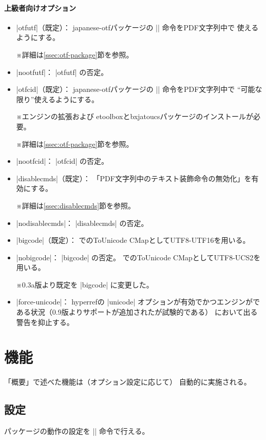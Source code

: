 \documentclass[uplatex,dvipdfmx,a4paper]{jsarticle}
\newcommand{\Pkg}[1]{\textsf{#1}}
\newcommand{\Note}{\par\noindent ※}
\newcommand{\Means}{：\quad}
\providecommand{\Strong}[1]{\textsf{#1}}
\begin{document}
\paragraph{上級者向けオプション}\mbox{}
\begin{itemize}
\item |otfutf|（既定）\Means
  \Pkg{japanese-otf}パッケージの |\UTF| 命令をPDF文字列中で
  使えるようにする。
  \Note 詳細は\ref{ssec:otf-package}節を参照。
\item |nootfutf|\Means
  |otfutf| の否定。
\item |otfcid|（既定）\Means
  \Pkg{japanese-otf}パッケージの |\CID| 命令をPDF文字列中で
  “可能な限り”使えるようにする。
  \Note エンジンの{\eTeX}拡張および
  \Pkg{etoolbox}と\Pkg{bxjatoucs}パッケージのインストールが必要。
  \Note 詳細は\ref{ssec:otf-package}節を参照。
\item |nootfcid|\Means
  |otfcid| の否定。
\item |disablecmds|（既定）\Means
  「PDF文字列中のテキスト装飾命令の無効化」を有効にする。
  \Note 詳細は\ref{ssec:disablecmds}節を参照。
\item |nodisablecmds|\Means
  |disablecmds| の否定。
\item |bigcode|（既定）\Means
  {\upTeX}でのToUnicode CMapとしてUTF8-UTF16を用いる。
\item |nobigcode|\Means
  |bigcode| の否定。
  {\upTeX}でのToUnicode CMapとしてUTF8-UCS2を用いる。
  \Note 0.3a版より既定を |bigcode| に変更した。
\item |force-unicode|\Means
  \Pkg{hyperref}の |unicode| オプションが有効でかつエンジンが{\pTeX}で
  ある状況（0.9版よりサポートが追加されたが\Strong{試験的}である）
  において出る警告を抑止する。
\end{itemize}

\section{機能}

「概要」で述べた機能は（オプション設定に応じて）
自動的に実施される。

\subsection{設定}
\label{ssec:setup}

パッケージの動作の設定を |\pxjahypersetup| 命令で行える。
\end{document}
